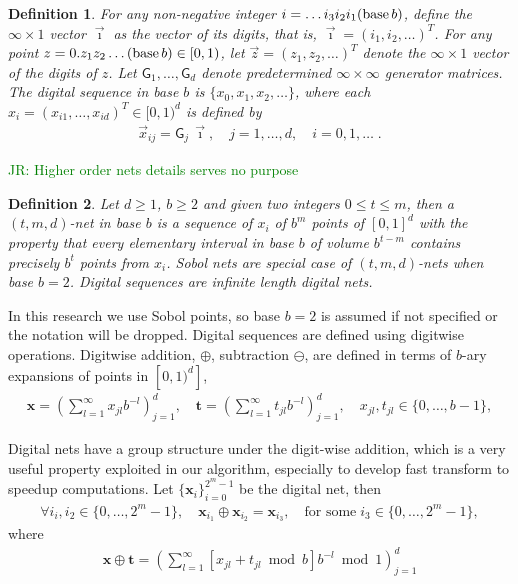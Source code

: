 \documentclass{iitthesis}          %
\newtheorem{defn}{Definition}
\newcommand{\bm}[1]{\boldsymbol{#1}}
\newcommand{\vt}{\bm{t}}
\newcommand{\vx}{\bm{x}}
\newcommand{\JRNote}[1]{{\textcolor{green}{JR: #1}}}
\begin{document}
\begin{defn}
For any non-negative integer $i = \dots i_3 i_2 i_1(\textup{base} \, b)$, define the $\infty \times 1$ vector $\vec{\imath}$ as the vector of its digits, that is, $\vec{\imath} = (i_1, i_2, \dots)^T$. 
For any point $z = 0.z_1 z_2 \dots (\textup{base}\, b) \in [0, 1)$, let $\vec{z} = (z_1, z_2, \dots)^T$ denote the $\infty \times 1$ vector of the digits of $z$. Let $ \mathsf{G}_1, \dots , \mathsf{G}_d$ denote predetermined $\infty \times \infty$ generator matrices. 
The digital sequence in \textup{base} $b$ is $\{x_0, x_1, x_2, \dots\}$, where each $x_i = ( x_{i1}, \dots , x_{id})^T \in [0, 1)^d$ is defined by
\begin{align*}
\vec{x}_{ij} = \mathsf{G}_j \, \vec{\imath}, \quad j = 1, \dots, d, \quad i = 0, 1, \dots \;.
\end{align*}
\end{defn}


\JRNote{Higher order nets details serves no purpose}
\begin{defn}
Let $d \ge 1$, $b\ge 2$ and given two integers $0 \le t \le m$, then a $(t,m,d)$-net in base $b$ is a sequence of $x_i$ of $b^m$ points of $[0,1]^d$  
with the property that every elementary interval in base $b$ of volume $b^{t-m}$ contains precisely $b^t$ points from $x_i$. Sobol \cite{Sob76}  nets are special case of $(t,m, d)$-nets when base $b=2$. Digital sequences are infinite length digital nets.
\end{defn}

In this research we use Sobol points, so base $b=2$ is assumed if not specified or the notation will be dropped.  
Digital sequences are defined using digitwise operations. Digitwise addition, $\oplus$, subtraction $\ominus$, are defined in terms of $b$-ary expansions of points in $[0, 1)^d]$,
\begin{align*}
\vx = \left( \sum_{l=1}^{\infty} x_{jl}b^{-l}\right)_{j=1}^d, \quad
\vt = \left( \sum_{l=1}^{\infty} t_{jl}b^{-l}\right)_{j=1}^d, \quad
x_{jl}, t_{jl} \in \{0,\dots,b-1\},
\end{align*}

Digital nets have a group structure under the digit-wise addition, which is a very useful property exploited in our algorithm, especially to develop fast transform to speedup computations. 
Let $\{\vx_i\}_{i=0}^{2^m-1}$ be the digital net, then
\begin{align*}
\forall i_i, i_2 \in \{0,\dots,2^m-1\}, \quad \vx_{i_1} \oplus \vx_{i_2} = \vx_{i_3}, \quad \text{for some} \; i_3 \in \{0,\dots,2^m-1\},
\end{align*}
where
\begin{align*}
\vx \oplus \vt = \left( \sum_{l=1}^\infty [x_{jl} + t_{jl} \bmod b] b^{-l} \bmod 1 \right)_{j=1}^d
\end{align*}
\end{document}
